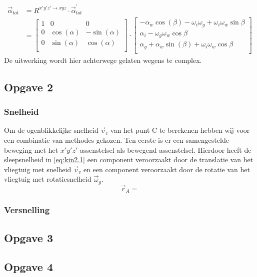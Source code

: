 \begin{equation}
\begin{split}
\vec{\alpha}_{tot}&=R^{x'y'z' \rightarrow xyz} \cdot \vec{\alpha}_{tot}^{'}\\
&=\begin{bmatrix}
1			&			0			&			0		   \\
0			&\cos(\alpha)&-\sin(\alpha)\\
0			&\sin(\alpha)&\cos(\alpha) \\
\end{bmatrix}
\cdot
\begin{bmatrix}
-\alpha_{w}\cos(\beta)-\omega_{i}\omega_{g}+\omega_{i}\omega_{w}\sin{\beta}\\
\alpha_{i}-\omega_{g}\omega_{w}\cos{\beta}\\
\alpha_{g}+	\alpha_{w} \sin(\beta)+\omega_{i}\omega_{w}\cos{\beta}\\
\end{bmatrix}
\end{split}
\label{eq:kin1.9}
\end{equation}
De uitwerking wordt hier achterwege gelaten wegens te complex.
\newpage
\subsection{Opgave 2}
\subsubsection{Snelheid}
Om de ogenblikkelijke snelheid $\vec{v}_{c}$ van het punt C te berekenen hebben wij voor een combinatie van methodes gekozen. Ten eerste is er een samengestelde beweging met het $x'y'z'$-assenstelsel als bewegend assenstelsel. Hierdoor heeft de sleepsnelheid in \eqref{eq:kin2.1} een component veroorzaakt door de translatie van het vliegtuig met snelheid $\vec{v}_{v}$ en een component veroorzaakt door de rotatie van het vliegtuig met rotatiesnelheid $\vec{\omega}_{g}$.
\begin{equation}
\vec{r}_{A}=
\label{eq:kin2.1}
\end{equation}
\subsubsection{Versnelling}
\subsection{Opgave 3}
\subsection{Opgave 4}